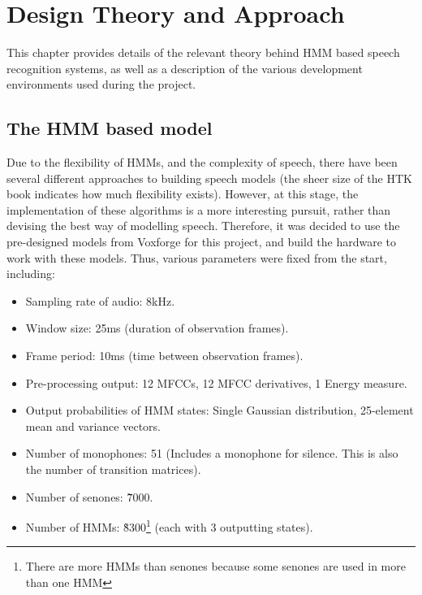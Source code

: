 \chapter{Design Theory and Approach} %
\label{cha:design_approach}


This chapter provides details of the relevant theory behind HMM based speech recognition systems, as well as a description of the various development environments used during the project.

\section{The HMM based model} %
\label{sec:the_hmm_based_model}
	Due to the flexibility of HMMs, and the complexity of speech, there have been several different approaches to building speech models (the sheer size of the HTK book indicates how much flexibility exists).  However, at this stage, the implementation of these algorithms is a more interesting pursuit, rather than devising the best way of modelling speech.  Therefore, it was decided to use the pre-designed models from Voxforge for this project, and build the hardware to work with these models.  Thus, various parameters were fixed from the start, including:

	\begin{itemize}
		\item Sampling rate of audio: 8kHz. %
		\item Window size: 25ms (duration of observation frames).
		\item Frame period: 10ms (time between observation frames).
		\item Pre-processing output: 12 MFCCs, 12 MFCC derivatives, 1 Energy measure.
		\item Output probabilities of HMM states: Single Gaussian distribution, 25-element mean and variance vectors.
		\item Number of monophones: 51 (Includes a monophone for silence.  This is also the number of transition matrices).
		\item Number of senones: \~7000.
		\item Number of HMMs: \~8300\footnote{There are more HMMs than senones because some senones are used in more than one HMM} (each with 3 outputting states).
	\end{itemize}

